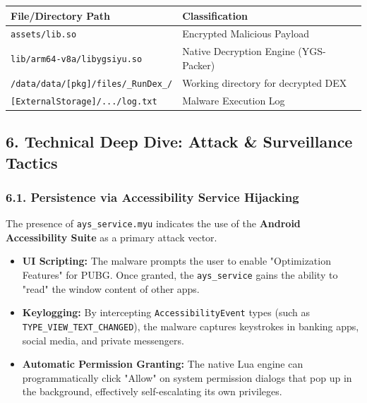 \documentclass[
]{article}
\begin{document}
\begin{longtable}[]{@{}ll@{}}
\toprule\noalign{}
File/Directory Path & Classification \\
\midrule\noalign{}
\endhead
\bottomrule\noalign{}
\endlastfoot
\texttt{assets/lib.so} & Encrypted Malicious Payload \\
\texttt{lib/arm64-v8a/libygsiyu.so} & Native Decryption Engine
(YGS-Packer) \\
\texttt{/data/data/{[}pkg{]}/files/\_RunDex\_/} & Working directory for
decrypted DEX \\
\texttt{{[}ExternalStorage{]}/.../log.txt} & Malware Execution Log \\
\end{longtable}

\subsection{\texorpdfstring{\textbf{6. Technical Deep Dive: Attack \&
Surveillance
Tactics}}{6. Technical Deep Dive: Attack \& Surveillance Tactics}}\label{6-technical-deep-dive-attack--surveillance-tactics}

\subsubsection{\texorpdfstring{\textbf{6.1. Persistence via
Accessibility Service
Hijacking}}{6.1. Persistence via Accessibility Service Hijacking}}\label{61-persistence-via-accessibility-service-hijacking}

The presence of \texttt{ays\_service.myu} indicates the use of the
\textbf{Android Accessibility Suite} as a primary attack vector.

\begin{itemize}
\item
  \textbf{UI Scripting:} The malware prompts the user to enable
  "Optimization Features" for PUBG. Once granted, the
  \texttt{ays\_service} gains the ability to "read" the window content
  of other apps.
\item
  \textbf{Keylogging:} By intercepting \texttt{AccessibilityEvent} types
  (such as \texttt{TYPE\_VIEW\_TEXT\_CHANGED}), the malware captures
  keystrokes in banking apps, social media, and private messengers.
\item
  \textbf{Automatic Permission Granting:} The native Lua engine can
  programmatically click "Allow" on system permission dialogs that pop
  up in the background, effectively self-escalating its own privileges.
\end{itemize}
\end{document}
